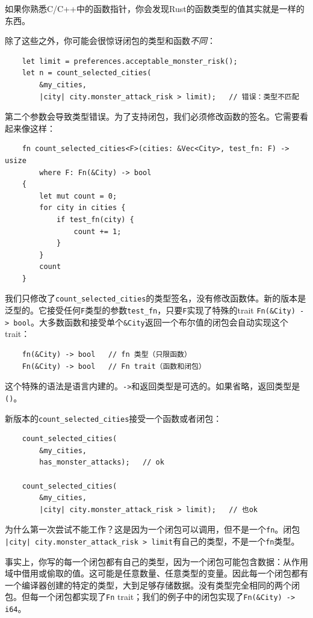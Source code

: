 如果你熟悉C/C++中的函数指针，你会发现Rust的函数类型的值其实就是一样的东西。

除了这些之外，你可能会很惊讶闭包的类型和函数\emph{不同}：
\begin{verbatim}
    let limit = preferences.acceptable_monster_risk();
    let n = count_selected_cities(
        &my_cities,
        |city| city.monster_attack_risk > limit);   // 错误：类型不匹配
\end{verbatim}

第二个参数会导致类型错误。为了支持闭包，我们必须修改函数的签名。它需要看起来像这样：
\begin{verbatim}
    fn count_selected_cities<F>(cities: &Vec<City>, test_fn: F) -> usize
        where F: Fn(&City) -> bool
    {
        let mut count = 0;
        for city in cities {
            if test_fn(city) {
                count += 1;
            }
        }
        count
    }
\end{verbatim}

我们只修改了\texttt{count\_selected\_cities}的类型签名，没有修改函数体。新的版本是泛型的。它接受任何\texttt{F}类型的参数\texttt{test\_fn}，只要\texttt{F}实现了特殊的trait \texttt{Fn(\&City) -> bool}。大多数函数和接受单个\texttt{\&City}返回一个布尔值的闭包会自动实现这个trait：
\begin{verbatim}
    fn(&City) -> bool   // fn 类型（只限函数）
    Fn(&City) -> bool   // Fn trait（函数和闭包）
\end{verbatim}

这个特殊的语法是语言内建的。\texttt{->}和返回类型是可选的。如果省略，返回类型是\texttt{()}。

新版本的\texttt{count\_selected\_cities}接受一个函数或者闭包：
\begin{verbatim}
    count_selected_cities(
        &my_cities,
        has_monster_attacks);   // ok

    count_selected_cities(
        &my_cities,
        |city| city.monster_attack_risk > limit);   // 也ok
\end{verbatim}

为什么第一次尝试不能工作？这是因为一个闭包可以调用，但不是一个\texttt{fn}。闭包\\
\texttt{|city| city.monster\_attack\_risk > limit}有自己的类型，不是一个\texttt{fn}类型。

事实上，你写的每一个闭包都有自己的类型，因为一个闭包可能包含数据：从作用域中借用或偷取的值。这可能是任意数量、任意类型的变量。因此每一个闭包都有一个编译器创建的特定的类型，大到足够存储数据。没有类型完全相同的两个闭包。但每一个闭包都实现了\texttt{Fn} trait；我们的例子中的闭包实现了\texttt{Fn(\&City) -> i64}。

